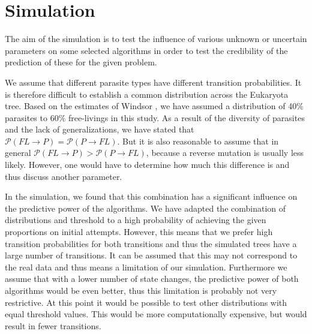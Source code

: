   \section{Simulation} \label{sec:discussion - simulation}
    The aim of the simulation is to test the influence of various unknown or uncertain parameters on 
      some selected algorithms in order to test the credibility of the prediction of these for the 
      given problem.

    We assume that different parasite types have different transition probabilities. It is therefore 
      difficult to establish a common distribution across the Eukaryota tree. Based on the estimates 
      of Windsor \cite{Windsor1998}, we have assumed a distribution of 40\% parasites to 60\% 
      free-livings in this study. As a result of the diversity of parasites and the lack of 
      generalizations, we have stated that 
      $\mathcal{P}(FL \rightarrow P) = \mathcal{P}(P \rightarrow FL)$. But it is also reasonable to 
      assume that in general $\mathcal{P}(FL \rightarrow P) > \mathcal{P}(P \rightarrow FL)$, because 
      a reverse mutation is usually less likely. However, one would have to determine how much this 
      difference is and thus discuss another parameter.
    
    In the simulation, we found that this combination has a significant influence on the predictive 
      power of the algorithms. We have adapted the combination of distributions and threshold to a 
      high probability of achieving the given proportions on initial attempts. However, this means 
      that we prefer high transition probabilities for both transitions and thus the simulated trees 
      have a large number of transitions. It can be assumed that this may not correspond to the real 
      data and thus means a limitation of our simulation. Furthermore we assume that with a lower 
      number of state changes, the predictive power of both algorithms would be even better, thus this 
      limitation is probably not very restrictive. At this point it would be possible to test other 
      distributions with equal threshold values. This would be more computationally expensive, but 
      would result in fewer transitions.

